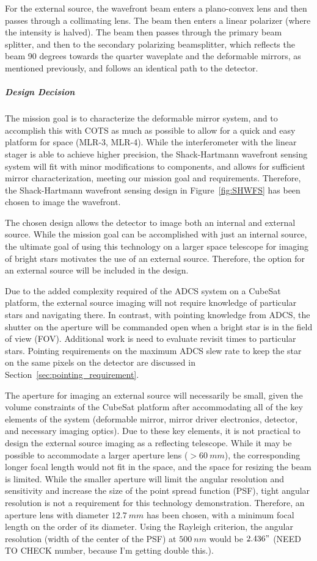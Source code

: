\documentclass[12pt]{article}
\begin{document}
For the external source, the wavefront beam enters a plano-convex lens and then passes through a collimating lens. The beam then enters a linear polarizer (where the intensity is halved). The beam then passes through the primary beam splitter, and then to the secondary polarizing beamsplitter, which reflects the beam 90 degrees towards the quarter waveplate and the deformable mirrors, as mentioned previously, and follows an identical path to the detector.

\subparagraph{Design Decision}
The mission goal is to characterize the deformable mirror system, and to accomplish this with COTS as much as possible to allow for a quick and easy platform for space (MLR-3, MLR-4). While the interferometer with the linear stager is able to achieve higher precision, the Shack-Hartmann wavefront sensing system will fit with minor modifications to components, and allows for sufficient mirror characterization, meeting our mission goal and requirements. Therefore, the Shack-Hartmann wavefront sensing design in Figure~\ref{fig:SHWFS} has been chosen to image the wavefront.

The chosen design allows the detector to image both an internal and external source. While the mission goal can be accomplished with just an internal source, the ultimate goal of using this technology on a larger space telescope for imaging of bright stars motivates the use of an external source. Therefore, the option for an external source will be included in the design.

Due to the added complexity required of the ADCS system on a CubeSat platform, the external source imaging will not require knowledge of particular stars and navigating there. In contrast, with pointing knowledge from ADCS, the shutter on the aperture will be commanded open when a bright star is in the field of view (FOV). Additional work is need to evaluate revisit times to particular stars. Pointing requirements on the maximum ADCS slew rate to keep the star on the same pixels on the detector are discussed in Section~\ref{sec:pointing_requirement}.

The aperture for imaging an external source will necessarily be small, given the volume constraints of the CubeSat platform after accommodating all of the key elements of the system (deformable mirror, mirror driver electronics, detector, and necessary imaging optics). Due to these key elements, it is not practical to design the external source imaging as a reflecting telescope. While it may be possible to accommodate a larger aperture lens ($>60\ mm$), the corresponding longer focal length would not fit in the space, and the space for resizing the beam is limited. While the smaller aperture will limit the angular resolution and sensitivity and increase the size of the point spread function (PSF), tight angular resolution is not a requirement for this technology demonstration. Therefore, an aperture lens with diameter $12.7\ mm$ has been chosen, with a minimum focal length on the order of its diameter. Using the Rayleigh criterion, the angular resolution (width of the center of the PSF) at $500\ nm$ would be $2.436"$ (NEED TO CHECK number, because I’m getting double this.).
\end{document}
